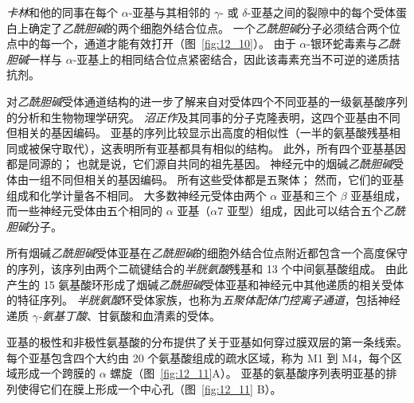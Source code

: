 \textit{卡林}和他的同事在每个 $\alpha$-亚基与其相邻的 $\gamma$- 或 $\delta$-亚基之间的裂隙中的每个受体蛋白上确定了\textit{乙酰胆碱}的两个细胞外结合位点。
一个\textit{乙酰胆碱}分子必须结合两个位点中的每一个，通道才能有效打开（图~\ref{fig:12_10}）。
由于 $\alpha$-银环蛇毒素与\textit{乙酰胆碱}一样与 $\alpha$-亚基上的相同结合位点紧密结合，因此该毒素充当不可逆的递质拮抗剂。


对\textit{乙酰胆碱}受体通道结构的进一步了解来自对受体四个不同亚基的一级氨基酸序列的分析和生物物理学研究。
\textit{沼正作}及其同事的分子克隆表明，这四个亚基由不同但相关的基因编码。
亚基的序列比较显示出高度的相似性（一半的氨基酸残基相同或被保守取代），这表明所有亚基都具有相似的结构。 
此外，所有四个亚基基因都是同源的；
也就是说，它们源自共同的祖先基因。
神经元中的烟碱\textit{乙酰胆碱}受体由一组不同但相关的基因编码。
所有这些受体都是五聚体；
然而，它们的亚基组成和化学计量各不相同。
大多数神经元受体由两个 $\alpha$ 亚基和三个 $\beta$ 亚基组成，而一些神经元受体由五个相同的 $\alpha$ 亚基（$\alpha$7 亚型）组成，因此可以结合五个\textit{乙酰胆碱}分子。


所有烟碱\textit{乙酰胆碱}受体亚基在\textit{乙酰胆碱}的细胞外结合位点附近都包含一个高度保守的序列，该序列由两个二硫键结合的\textit{半胱氨酸}残基和 13 个中间氨基酸组成。
由此产生的 15 氨基酸环形成了烟碱\textit{乙酰胆碱}受体亚基和神经元中其他递质的相关受体的特征序列。
\textit{半胱氨酸}环受体家族，也称为\textit{五聚体配体门控离子通道}，包括神经递质 \textit{$\gamma$-氨基丁酸}、甘氨酸和血清素的受体。


亚基的极性和非极性氨基酸的分布提供了关于亚基如何穿过膜双层的第一条线索。
每个亚基包含四个大约由 20 个氨基酸组成的疏水区域，称为 M1 到 M4，每个区域形成一个跨膜的 $\alpha$ 螺旋（图~\ref{fig:12_11}A）。
亚基的氨基酸序列表明亚基的排列使得它们在膜上形成一个中心孔（图~\ref{fig:12_11} B）。


